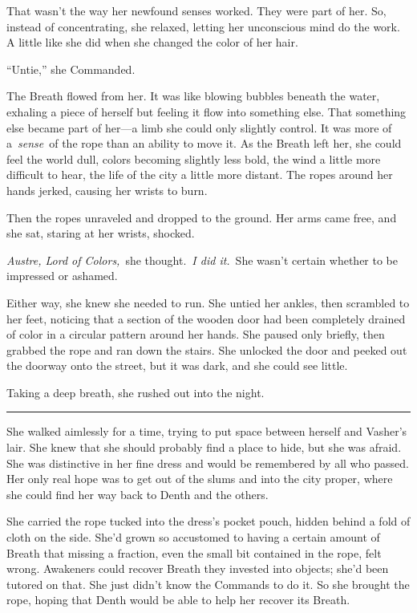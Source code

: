 That wasn’t the way her newfound senses worked. They were part of her. So, instead of concentrating, she relaxed, letting her unconscious mind do the work. A little like she did when she changed the color of her hair.

“Untie,” she Commanded.

The Breath flowed from her. It was like blowing bubbles beneath the water, exhaling a piece of herself but feeling it flow into something else. That something else became part of her—a limb she could only slightly control. It was more of a~\textit{sense}~of the rope than an ability to move it. As the Breath left her, she could feel the world dull, colors becoming slightly less bold, the wind a little more difficult to hear, the life of the city a little more distant. The ropes around her hands jerked, causing her wrists to burn.

Then the ropes unraveled and dropped to the ground. Her arms came free, and she sat, staring at her wrists, shocked.

\textit{Austre, Lord of Colors,}~she thought.~\textit{I did it.}~She wasn’t certain whether to be impressed or ashamed.

Either way, she knew she needed to run. She untied her ankles, then scrambled to her feet, noticing that a section of the wooden door had been completely drained of color in a circular pattern around her hands. She paused only briefly, then grabbed the rope and ran down the stairs. She unlocked the door and peeked out the doorway onto the street, but it was dark, and she could see little.

Taking a deep breath, she rushed out into the night.

\bigskip \hrule \bigskip

She walked aimlessly for a time, trying to put space between herself and Vasher’s lair. She knew that she should probably find a place to hide, but she was afraid. She was distinctive in her fine dress and would be remembered by all who passed. Her only real hope was to get out of the slums and into the city proper, where she could find her way back to Denth and the others.

She carried the rope tucked into the dress’s pocket pouch, hidden behind a fold of cloth on the side. She’d grown so accustomed to having a certain amount of Breath that missing a fraction, even the small bit contained in the rope, felt wrong. Awakeners could recover Breath they invested into objects; she’d been tutored on that. She just didn’t know the Commands to do it. So she brought the rope, hoping that Denth would be able to help her recover its Breath.

